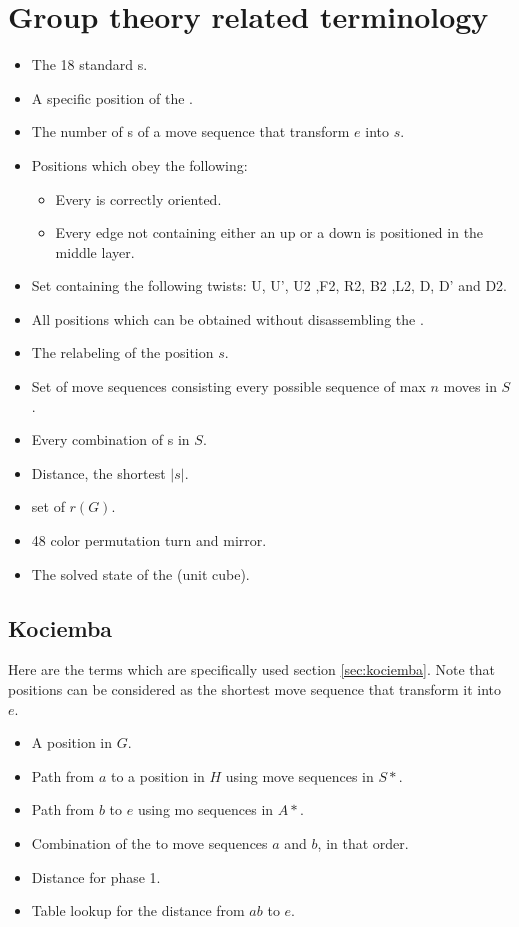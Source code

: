 \section{Group theory related terminology}
\begin{itemize}
\item {}The 18 standard \twist{}s.
\item {}A specific position of the \rubik{}.
\item {}The number of \twist{}s of a move sequence that transform $e$ into $s$.
\item {}Positions which obey the following:
\begin{itemize}
	\item Every \cpiece{} is correctly oriented.
	\item Every edge \cpiece{} not containing either an up \facelet{} or a down \facelet{} is positioned in the middle layer.
\end{itemize}
\item {}Set containing the following twists: U, U', U2 ,F2, R2, B2 ,L2, D, D' and D2.
\item {}All positions which can be obtained without disassembling the \rubik{}. 
\item {}The relabeling of the position $s$.
\item {}Set of move sequences consisting every possible sequence of max $n$ moves in $S$.
\item {}Every combination of \twist{}s in $S$.
\item {}Distance, the shortest $|s|$.
\item {}set of $r(G)$.
\item {}48 color permutation turn and mirror.
\item {}The solved state of the \rubik{}(unit cube).
\end{itemize}

\subsection{Kociemba}
Here are the terms which are specifically used section \ref{sec:kociemba}. Note that positions can be considered as the shortest move sequence that transform it into $e$.
\begin{itemize}
\item {}A position in $G$.
\item {}Path from $a$ to a position in $H$ using move sequences in $S*$.
\item {}Path from $b$ to $e$ using mo sequences in $A*$.
\item {}Combination of the to move sequences $a$ and $b$, in that order.
\item {}Distance for phase 1.
\item {}Table lookup for the distance from $ab$ to $e$.
\end{itemize}





